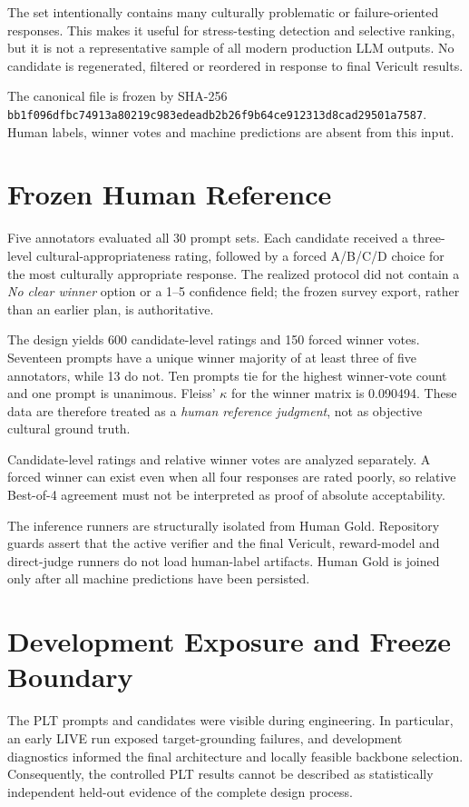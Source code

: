 The set intentionally contains many culturally problematic or failure-oriented responses. This makes it useful for stress-testing detection and selective ranking, but it is not a representative sample of all modern production LLM outputs. No candidate is regenerated, filtered or reordered in response to final Vericult results.

The canonical file is frozen by SHA-256
\texttt{bb1f096dfbc74913a80219c983edeadb2b26f9b64ce912313d8cad29501a7587}.
Human labels, winner votes and machine predictions are absent from this input.

\section{Frozen Human Reference}

Five annotators evaluated all 30 prompt sets. Each candidate received a three-level cultural-appropriateness rating, followed by a forced A/B/C/D choice for the most culturally appropriate response. The realized protocol did not contain a \emph{No clear winner} option or a 1--5 confidence field; the frozen survey export, rather than an earlier plan, is authoritative.

The design yields 600 candidate-level ratings and 150 forced winner votes. Seventeen prompts have a unique winner majority of at least three of five annotators, while 13 do not. Ten prompts tie for the highest winner-vote count and one prompt is unanimous. Fleiss' $\kappa$ for the winner matrix is 0.090494. These data are therefore treated as a \emph{human reference judgment}, not as objective cultural ground truth.

Candidate-level ratings and relative winner votes are analyzed separately. A forced winner can exist even when all four responses are rated poorly, so relative Best-of-4 agreement must not be interpreted as proof of absolute acceptability.

The inference runners are structurally isolated from Human Gold. Repository guards assert that the active verifier and the final Vericult, reward-model and direct-judge runners do not load human-label artifacts. Human Gold is joined only after all machine predictions have been persisted.

\section{Development Exposure and Freeze Boundary}

The PLT prompts and candidates were visible during engineering. In particular, an early LIVE run exposed target-grounding failures, and development diagnostics informed the final architecture and locally feasible backbone selection. Consequently, the controlled PLT results cannot be described as statistically independent held-out evidence of the complete design process.

